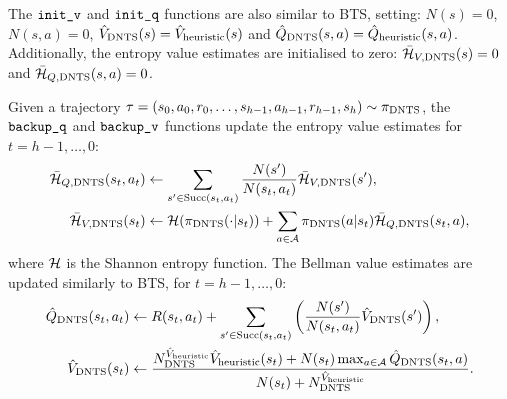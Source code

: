     \sloppypar{
        The DENTS search policy is similar to BTS: 
        \begin{align}
            \pidents(a|s) &= (1-\lambdadents)\rhodents(a|s) + \frac{\lambdadents}{|\cl{A}|}, 
                        \label{eq:dents_search_policy} \\ 
            \rhodents(a|s) &\propto \exp\left(\frac{\Qdentsnorm(s,a)}{\alphadents(N(s))}\right),
                        \label{eq:dents_value_policy} \\
            \lambda(s,\epsilon) &= \min\left(1, \frac{\epsilon}{\log(e+N(s))}\right).
        \end{align} %
        where \mbox{$\epsdents \in [0,\infty)$} is an exploration parameter, and a temperature of \mbox{$\alphadents(N(s))=0$} is taken to mean that \mbox{$\rhodents$} selects greedily with respect to \mbox{$\Qdentsnorm$}.
    }

    The ${\textnormal{\texttt{init\_v}}}$ and ${\textnormal{\texttt{init\_q}}}$ functions are also similar to BTS, setting: $N(s)=0$, $N(s,a)=0$, ${\hat{V}_{{\textnormal{DNTS}}}}(s)={\hat{V}_{\textnormal{heuristic}}}(s)$ and ${\hat{Q}_{{\textnormal{DNTS}}}}(s,a)={\hat{Q}_{\textnormal{heuristic}}}(s,a)$. Additionally, the entropy value estimates are initialised to zero: ${\bar{\mathcal{H}}_{V,{\textnormal{DNTS}}}}(s)=0$ and ${\bar{\mathcal{H}}_{Q,{\textnormal{DNTS}}}}(s,a)=0$.

    Given a trajectory $\tau=(s_0,a_0,r_0,\ldots,s_{h-1},a_{h-1},r_{h-1},s_h)\sim{\pi_{{\textnormal{DNTS}}}}$, the ${\textnormal{\texttt{backup\_q}}}$ and ${\textnormal{\texttt{backup\_v}}}$ functions update the entropy value estimates for $t=h-1,\ldots,0$:
    \begin{align}
        {\bar{\mathcal{H}}_{Q,{\textnormal{DNTS}}}}(s_t,a_t) &\leftarrow \sum_{s'\in {\textnormal{Succ}(s_t,a_t)}} \frac{N(s')}{N(s_t,a_t)} {\bar{\mathcal{H}}_{V,{\textnormal{DNTS}}}}(s'), 
            \label{eq:4:dents_entropy_q_backup} \\
        {\bar{\mathcal{H}}_{V,{\textnormal{DNTS}}}}(s_t) &\leftarrow \mathcal{H}({\pi_{{\textnormal{DNTS}}}}(\cdot | s_t)) + \sum_{a\in\mathcal{A}} {\pi_{{\textnormal{DNTS}}}}(a|s_t){\bar{\mathcal{H}}_{Q,{\textnormal{DNTS}}}}(s_t,a), 
            \label{eq:4:dents_entropy_v_backup} 
    \end{align}
    where $\mathcal{H}$ is the Shannon entropy function. The Bellman value estimates are updated similarly to BTS, for $t=h-1,\ldots,0$:
    \begin{align}
        {\hat{Q}_{{\textnormal{DNTS}}}}(s_t,a_t) &\leftarrow 
            R(s_t,a_t) + \sum_{s' \in {\textnormal{Succ}(s_t,a_t)}} \left( \frac{N(s')}{N(s_t,a_t)} {\hat{V}_{{\textnormal{DNTS}}}}(s') \right), 
                    \label{eq:dents_q_backup} \\ 
        {\hat{V}_{{\textnormal{DNTS}}}}(s_t) &\leftarrow \frac{N^{{\hat{V}_{\textnormal{heuristic}}}}_{{\textnormal{DNTS}}} {\hat{V}_{\textnormal{heuristic}}}(s_t) + N(s_t) \max_{a\in\mathcal{A}} {\hat{Q}_{{\textnormal{DNTS}}}}(s_t,a)}{N(s_t)+N^{{\hat{V}_{\textnormal{heuristic}}}}_{{\textnormal{DNTS}}}}.
                    \label{eq:4:dents_backup_v} 
    \end{align}

